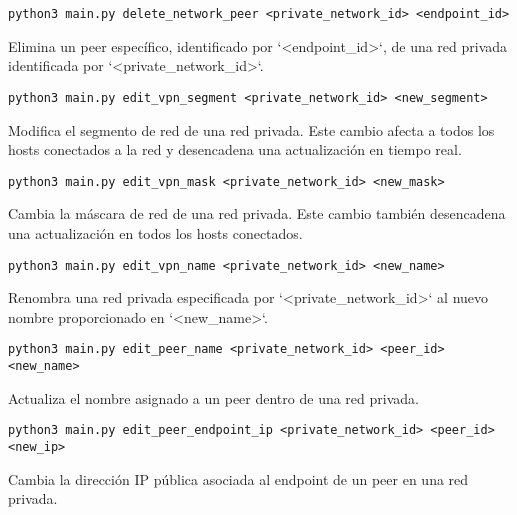     \begin{Verbatim}[breaklines=true]
    python3 main.py delete_network_peer <private_network_id> <endpoint_id>
    \end{Verbatim} 
    Elimina un peer específico, identificado por `<endpoint\_id>`, de una red privada identificada por `<private\_network\_id>`.
    
    
    \begin{Verbatim}[breaklines=true]
    python3 main.py edit_vpn_segment <private_network_id> <new_segment>
    \end{Verbatim} 
    Modifica el segmento de red de una red privada. Este cambio afecta a todos los hosts conectados a la red y desencadena una actualización en tiempo real.
    
    \begin{Verbatim}[breaklines=true]
    python3 main.py edit_vpn_mask <private_network_id> <new_mask>
    \end{Verbatim} 
    Cambia la máscara de red de una red privada. Este cambio también desencadena una actualización en todos los hosts conectados.
    
    \begin{Verbatim}[breaklines=true]
    python3 main.py edit_vpn_name <private_network_id> <new_name>
    \end{Verbatim} 
    Renombra una red privada especificada por `<private\_network\_id>` al nuevo nombre proporcionado en `<new\_name>`.
    
   
    
    
    \begin{Verbatim}[breaklines=true]
    python3 main.py edit_peer_name <private_network_id> <peer_id> <new_name>
    \end{Verbatim} 
    Actualiza el nombre asignado a un peer dentro de una red privada.
    
    \begin{Verbatim}[breaklines=true]
    python3 main.py edit_peer_endpoint_ip <private_network_id> <peer_id> <new_ip>
    \end{Verbatim} 
    Cambia la dirección IP pública asociada al endpoint de un peer en una red privada.
    
